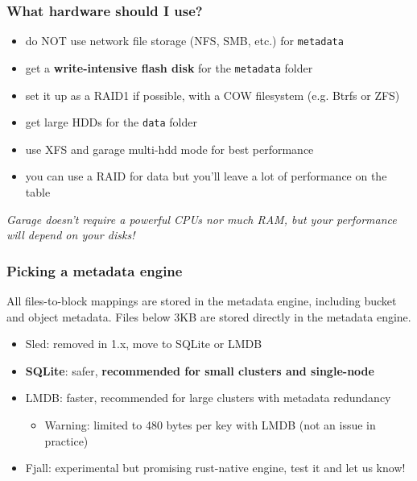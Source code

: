 \documentclass[aspectratio=169]{beamer}
\begin{document}
\begin{frame}
	\frametitle{What hardware should I use?}
	\begin{itemize}
	    \item do NOT use network file storage (NFS, SMB, etc.) for \texttt{\/metadata}
		\item get a \textbf{write-intensive flash disk} for the \texttt{\/metadata} folder
		\item set it up as a RAID1 if possible, with a COW filesystem (e.g. Btrfs or ZFS)
		\item get large HDDs for the \texttt{\/data} folder
		\item use XFS and garage multi-hdd mode for best performance
		\item you can use a RAID for data but you'll leave a lot of performance on the table
	\end{itemize}
	\center\textit{Garage doesn't require a powerful CPUs nor much RAM, but your performance will depend on your disks!}
\end{frame}

\begin{frame}
	\frametitle{Picking a metadata engine}
	All files-to-block mappings are stored in the metadata engine, including bucket and object metadata. Files below 3KB are stored directly in the metadata engine.
    \vspace{1em}
	\begin{itemize}
        \item Sled: removed in 1.x, move to SQLite or LMDB
	    \item \textbf{SQLite}: safer, \textbf{recommended for small clusters and single-node}
        \item LMDB: faster, recommended for large clusters with metadata redundancy
        \begin{itemize}
            \item Warning: limited to 480 bytes per key with LMDB (not an issue in practice)
        \end{itemize}
        \item Fjall: experimental but promising rust-native engine, test it and let us know!
	\end{itemize}
\end{frame}
\end{document}
